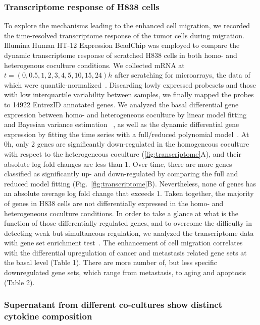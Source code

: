 \subsubsection{Transcriptome response of H838 cells}
To explore the mechanisms leading to the enhanced cell migration, we recorded the time-resolved transcriptome response of the tumor cells during migration.
Illumina Human HT-12 Expression BeadChip was employed to compare the dynamic transcriptome response of scratched H838 cells in both homo- and heterogenous coculture conditions.
We collected mRNA at $t=(0,0.5,1,2,3,4,5,10,15,24)h$ after scratching for microarrays,
the data of which were quantile-normalized~\citep{Dunning2008a}.  
Discarding lowly expressed probesets and those with low interquartile 
variability between samples, we finally mapped the probes to 14922 EntrezID 
annotated genes. 
We analyzed the basal differential gene expression between homo- and
heterogeneous coculture by linear model fitting and Bayesian variance estimation~%
\citep{Smyth2004}, as well as the dynamic differential gene expression by fitting
the time series with a full/reduced polynomial model~\citep{Mar2009}. At 0h, only 2
genes are significantly down-regulated in the homogeneous coculture with respect
to the heterogeneous coculture (\ref{fig:transcriptome}A), 
and their absolute log fold changes are less than 1. Over time, there are more
genes classified as significantly up- and down-regulated by comparing the full and
reduced model fitting (Fig.~\ref{fig:transcriptome}B). Nevertheless, none of genes
has an absolute
average log fold change that exceeds 1. Taken together, the majority of genes
in H838 cells are not differentially expressed in the homo- and heterogeneous
coculture conditions. In order to take a glance at what is the function of those
differentially regulated genes, and to overcome the difficulty in detecting weak
but simultaneous regulation, we analyzed the transcriptome data with gene set
enrichment test~\citep{Luo2009}.
The enhancement of cell migration correlates with the differential upregulation 
of cancer and metastasis related gene sets at the basal level (Table 1). 
There are more number of, but less specific downregulated gene sets, which range
from metastasis, to aging and apoptosis (Table 2). 

\subsubsection{Supernatant  from different co-cultures show distinct cytokine composition}

